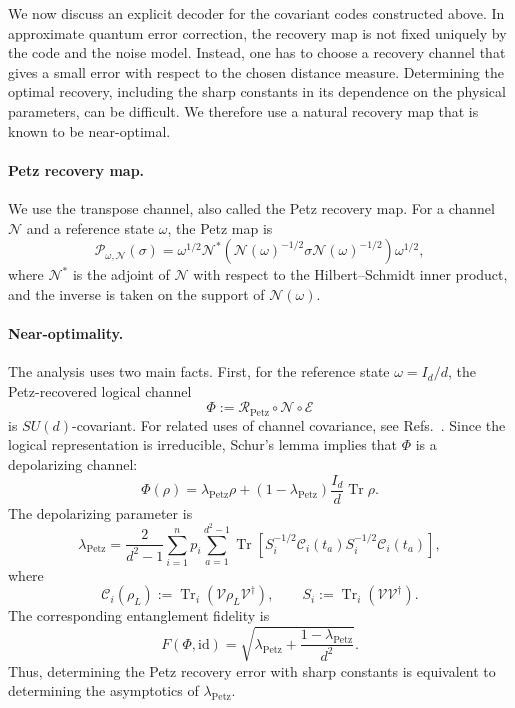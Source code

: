 \documentclass[10pt,twocolumn,superscriptaddress,aps,amsmath,amssymb,citeautoscript,floatfix,prx]{revtex4-2}
\theoremstyle{plain}
\theoremstyle{plain}
\theoremstyle{plain}
\theoremstyle{plain}
\theoremstyle{plain}
\theoremstyle{plain}
\theoremstyle{plain}
\theoremstyle{definition}
\theoremstyle{plain}
\begin{document}
We now discuss an explicit decoder for the covariant codes constructed above. In approximate quantum error correction, 
the recovery map is not fixed uniquely by the code and the noise model. Instead, one has to choose a recovery channel that gives a small error with 
respect to the chosen distance measure. Determining the optimal recovery, including the sharp constants in its dependence on the physical parameters, can be difficult. 
We therefore use a natural recovery map that is known to be near-optimal.

\paragraph{Petz recovery map.}

We use the transpose channel, also called the Petz recovery map. For a channel $\mathcal N$ and a reference state $\omega$, the Petz map is
$$
\mathcal P_{\omega,\mathcal N}(\sigma)
=
\omega^{1/2}
\mathcal N^*
\left(
\mathcal N(\omega)^{-1/2}
\sigma
\mathcal N(\omega)^{-1/2}
\right)
\omega^{1/2},
$$
where $\mathcal N^*$ is the adjoint of $\mathcal N$ with respect to the Hilbert--Schmidt inner product, and the inverse is taken on the support of $\mathcal N(\omega)$.

\paragraph{Near-optimality.}

The analysis uses two main facts. First, for the reference state $\omega=I_d/d$, the Petz-recovered logical channel
$$
\Phi
:=
\mathcal R_{\mathrm{Petz}}
\circ
\mathcal N
\circ
\mathcal E
$$
is $SU(d)$-covariant. For related uses of channel covariance, see Refs.~\cite{Zhou2021, Alexander2025}. Since the logical representation is irreducible, 
Schur's lemma implies that $\Phi$ is a depolarizing channel:
$$
\Phi(\rho)
=
\lambda_{\mathrm{Petz}}\rho
+
\left(1-\lambda_{\mathrm{Petz}}\right)
\frac{I_d}{d}\operatorname{Tr}\rho .
$$
The depolarizing parameter is
\begin{equation}\label{eq:lambda_P}
\lambda_{\mathrm{Petz}}
=
\frac{2}{d^2-1}
\sum_{i=1}^n p_i
\sum_{a=1}^{d^2-1}
\operatorname{Tr}
\left[
S_i^{-1/2}
\mathcal C_i(t_a)
S_i^{-1/2}
\mathcal C_i(t_a)
\right],
\end{equation}
where
$$
\mathcal C_i(\rho_L)
:=
\operatorname{Tr}_i\left(\mathcal{V}\rho_L\mathcal{V}^\dagger\right),
\qquad
S_i
:=
\operatorname{Tr}_i\left(\mathcal{V}\mathcal{V}^\dagger\right).
$$
The corresponding entanglement fidelity is
$$
F(\Phi,\mathrm{id})
=
\sqrt{
\lambda_{\mathrm{Petz}}
+
\frac{1-\lambda_{\mathrm{Petz}}}{d^2}
} .
$$
Thus, determining the Petz recovery error with sharp constants is equivalent to determining the asymptotics of $\lambda_{\mathrm{Petz}}$.
\end{document}
